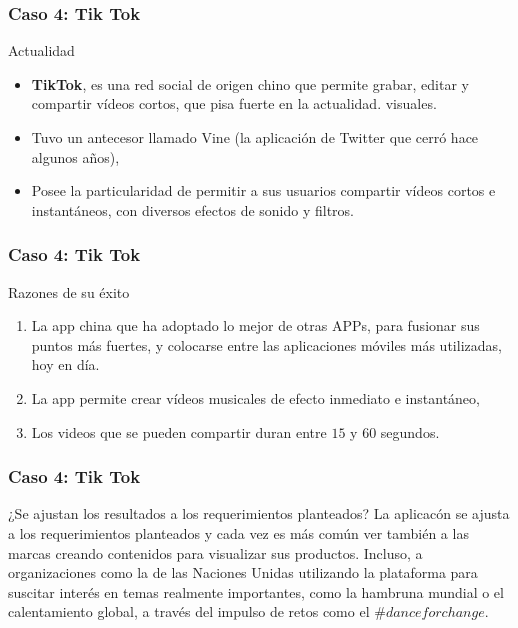 \documentclass[11pt]{beamer}
\begin{document}
    \begin{frame}
    	\frametitle{Caso 4: Tik Tok}
    	\begin{block}{Actualidad}
    		\begin{itemize}
    			\item \textbf{TikTok}, es una red social de origen chino que permite grabar, editar y compartir vídeos cortos, que pisa fuerte en la actualidad. visuales.
    			\item  Tuvo un antecesor llamado Vine (la aplicación de Twitter que cerró hace algunos años),
    			\item Posee la particularidad de permitir a sus usuarios compartir vídeos cortos e instantáneos, con diversos efectos de sonido y filtros.
    		\end{itemize}
    	\end{block}
    \end{frame}
    
    \begin{frame}
    	\frametitle{Caso 4: Tik Tok}
        \begin{block}{Razones de su éxito}
        	\begin{enumerate}
        		\item La app china que ha adoptado lo mejor de otras APPs, para fusionar sus puntos más fuertes, y colocarse entre las aplicaciones móviles más utilizadas, hoy en día.
        		\pause
        		\item La app permite crear vídeos musicales de efecto inmediato e instantáneo,
        		\pause
        		\item Los videos que se pueden compartir duran entre $15$ y $60$ segundos. 
        	\end{enumerate}
        \end{block}
    \end{frame}

    \begin{frame}
   	    \frametitle{Caso 4: Tik Tok}
   	    \begin{block}{¿Se ajustan los resultados a los requerimientos planteados?}
   	    	La aplicacón se ajusta a los requerimientos planteados y cada vez es más común ver también a las marcas creando contenidos para visualizar sus productos. Incluso, a organizaciones como la de las Naciones Unidas utilizando la plataforma para suscitar interés en temas realmente importantes, como la hambruna mundial o el calentamiento global, a través del impulso de retos como el $\#danceforchange.$
   	    \end{block}
    \end{frame}
    
\end{document}
